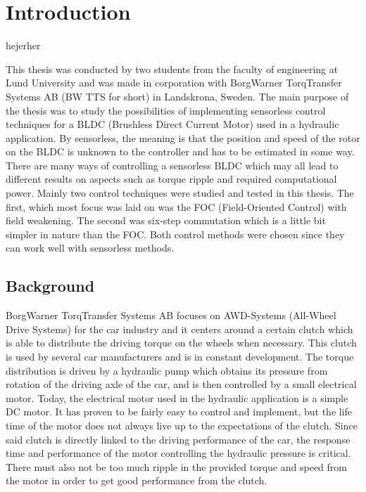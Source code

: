 \documentclass{LTHthesis}
\begin{document}
\chapter{Introduction}
hejerher

This thesis was conducted by two students from the faculty of engineering at Lund University and was made in corporation with BorgWarner TorqTransfer Systems AB (BW TTS for short) in Landskrona, Sweden. The main purpose of the thesis was to study the possibilities of implementing sensorless control techniques for a BLDC (Brushless Direct Current Motor) used in a hydraulic application. By sensorless, the meaning is that the position and speed of the rotor on the BLDC is unknown to the controller and has to be estimated in some way.
There are many ways of controlling a sensorless BLDC which may all lead to different results on aspects such as torque ripple and required computational power. Mainly two control techniques were studied and tested in this thesis. The first, which most focus was laid on was the FOC (Field-Oriented Control) with field weakening. The second was six-step commutation which is a little bit simpler in nature than the FOC. Both control methods were chosen since they can work well with sensorless methods.
\section{Background}
BorgWarner TorqTransfer Systems AB focuses on AWD-Systems (All-Wheel Drive Systems) for the car industry and it centers around a certain clutch which is able to distribute the driving torque on the wheels when necessary. This clutch is used by several car manufacturers and is in constant development. The torque distribution is driven by a hydraulic pump which obtains its pressure from rotation of the driving axle of the car, and is then controlled by a small electrical motor. Today, the electrical motor used in the hydraulic application is a simple DC motor. It has proven to be fairly easy to control and implement, but the life time of the motor does not always live up to the expectations of the clutch. Since said clutch is directly linked to the driving performance of the car, the response time and performance of the motor  controlling the hydraulic pressure is critical. There must also not be too much ripple in the provided torque and speed from the motor in order to get good performance from the clutch.
\end{document}
